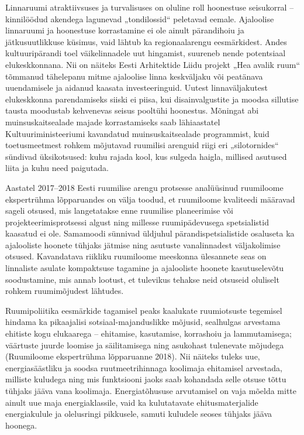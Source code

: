 \documentclass[estonian,]{article}
\begin{document}
Linnaruumi atraktiivsuses ja turvalisuses on oluline roll hoonestuse seisukorral -- kinnilöödud akendega lagunevad „tondilossid`` peletavad eemale. Ajaloolise linnaruumi ja hoonestuse korrastamine ei ole ainult pärandihoiu ja jätkusuutlikkuse küsimus, vaid lähtub ka regionaalarengu eesmärkidest. Andes kultuuripärandi toel väikelinnadele uut hingamist, suureneb nende potentsiaal elukeskkonnana. Nii on näiteks Eesti Arhitektide Liidu projekt „Hea avalik ruum`` tõmmanud tähelepanu mitme ajaloolise linna keskväljaku või peatänava uuendamisele ja aidanud kaasata investeeringuid. Uutest linnaväljakutest elukeskkonna parendamiseks siiski ei piisa, kui disainvalgustite ja moodsa sillutise tausta moodustab kehvenevas seisus pooltühi hoonestus. Mõningat abi muinsuskaitsealade majade korrastamiseks saab lähiaastatel Kultuuriministeeriumi kavandatud muinsuskaitsealade programmist, kuid toetusmeetmest rohkem mõjutavad ruumilisi arenguid riigi eri „silotornides`` sündivad üksikotsused: kuhu rajada kool, kus sulgeda haigla, millised asutused liita ja kuhu need paigutada.

Aastatel 2017--2018 Eesti ruumilise arengu protsesse analüüsinud ruumiloome ekspertrühma lõpparuandes on välja toodud, et ruumiloome kvaliteedi määravad sageli otsused, mis langetatakse enne ruumilise planeerimise või projekteerimisprotsessi algust ning millesse ruumipädevusega spetsialistid kaasatud ei ole. Samamoodi sünnivad üldjuhul pärandispetsialistide osaluseta ka ajalooliste hoonete tühjaks jätmise ning asutuste vanalinnadest väljakolimise otsused. Kavandatava riikliku ruumiloome meeskonna ülesannete seas on linnaliste asulate kompaktsuse tagamine ja ajalooliste hoonete kasutuselevõtu soodustamine, mis annab lootust, et tulevikus tehakse neid otsuseid oluliselt rohkem ruumimõjudest lähtudes.

Ruumipoliitika eesmärkide tagamisel peaks kaalukate ruumiotsuste tegemisel hindama ka pikaajalisi sotsiaal-majanduslikke mõjusid, sealhulgas arvestama ehitiste kogu elukaarega -- ehitamise, kasutamise, korrashoiu ja lammutamisega; väärtuste juurde loomise ja säilitamisega ning asukohast tulenevate mõjudega (Ruumiloome ekspertrühma lõpparuanne 2018). Nii näiteks tuleks uue, energiasäästliku ja soodsa ruutmeetrihinnaga koolimaja ehitamisel arvestada, milliste kuludega ning mis funktsiooni jaoks saab kohandada selle otsuse tõttu tühjaks jääva vana koolimaja. Energiatõhususe arvutamisel on vaja mõelda mitte ainult uue maja energiaklassile, vaid ka kulutatavate ehitusmaterjalide energiakulule ja olelusringi pikkusele, samuti kuludele seoses tühjaks jääva hoonega.
\end{document}

